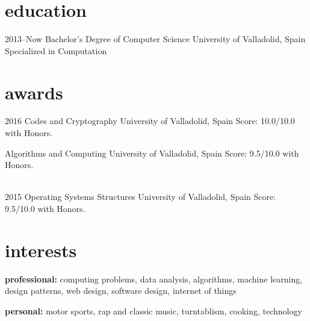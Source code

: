 \documentclass[]{friggeri-cv} %
\begin{document}

    \section{education}

        \begin{entrylist}

            \entry
            {2013--Now}
            {Bachelor's Degree {\normalfont of Computer Science}}
            {University of Valladolid, Spain}
            {Specialized in Computation}

        \end{entrylist}




    \section{awards}

        \begin{entrylist}

            \entry
            {2016}
            {Codes and Cryptography}
            {University of Valladolid, Spain}
            {Score: 10.0/10.0 with Honors.}

            \entry
            {}
            {Algorithms and Computing}
            {University of Valladolid, Spain}
            {Score: 9.5/10.0 with Honors.}

            \\
            \entry
            {2015}
            {Operating Systems Structures}
            {University of Valladolid, Spain}
            {Score: 9.5/10.0 with Honors.}

        \end{entrylist}





    \section{interests}

        \textbf{professional:} computing problems, data analysis, algorithms, machine learning, design patterns, web design, software design, internet of things

        \textbf{personal:} motor sports, rap and classic music, turntablism, cooking, technology

\end{document}
